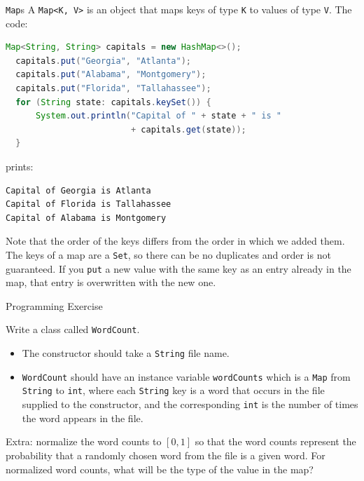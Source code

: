 \documentclass{beamer}
\begin{document}
\begin{frame}[fragile]{{\tt Map}s}
\vspace{-.05in}
A {\tt Map<K, V>} is an object that maps keys of type {\tt K} to values of type {\tt V}.  The code:
\begin{lstlisting}[language=Java]
  Map<String, String> capitals = new HashMap<>();
  capitals.put("Georgia", "Atlanta");
  capitals.put("Alabama", "Montgomery");
  capitals.put("Florida", "Tallahassee");
  for (String state: capitals.keySet()) {
      System.out.println("Capital of " + state + " is "
                         + capitals.get(state));
  }
\end{lstlisting}
prints:
\vspace{-.05in}
\begin{lstlisting}[language=Java]
Capital of Georgia is Atlanta
Capital of Florida is Tallahassee
Capital of Alabama is Montgomery
\end{lstlisting}
\vspace{-.05in}
Note that the order of the keys differs from the order in which we added them.  The keys of a map are a {\tt Set}, so there can be no duplicates and order is not guaranteed.  If you {\tt put} a new value with the same key as an entry already in the map, that entry is overwritten with the new one.

\end{frame}


\begin{frame}[fragile]{Programming Exercise}

Write a class called {\tt WordCount}.
\begin{itemize}
\item The constructor should take a {\tt String} file name.
\item {\tt WordCount} should have an instance variable {\tt wordCounts} which is a {\tt Map} from {\tt String} to {\tt int}, where each {\tt String} key is a word that occurs in the file supplied to the constructor, and the corresponding {\tt int} is the number of times the word appears in the file.
\end{itemize}
Extra: normalize the word counts to $[0, 1]$ so that the word counts represent the probability that a randomly chosen word from the file is a given word.  For normalized word counts, what will be the type of the value in the map?
\end{frame}








\end{document}
